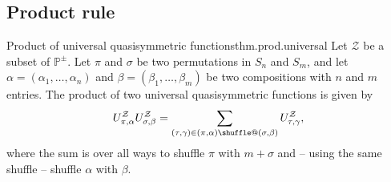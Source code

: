 \documentclass[numbers=enddot,12pt,final,onecolumn,notitlepage]{scrartcl}%
\makeatletter
\newcommand{\al}{\alpha}
\newcommand{\be}{\beta}
\newcommand{\PP}{\mathbb{P}} %
\providecommand*{\shuffle}{%
  \mathbin{\mathpalette\shuffle@{}}%
}
\newcommand*{\shuffle@}[2]{%
  \sbox0{$#1\vcenter{}$}%
  \kern .15\ht0 %
  \rlap{\vrule height .25\ht0 depth 0pt width 2.5\ht0}%
  \raise.1\ht0\hbox to 2.5\ht0{%
    \vrule height 1.75\ht0 depth -.1\ht0 width .17\ht0 %
    \hfill
    \vrule height 1.75\ht0 depth -.1\ht0 width .17\ht0 %
    \hfill
    \vrule height 1.75\ht0 depth -.1\ht0 width .17\ht0 %
  }%
  \kern .15\ht0 %
}
\newcommand{\0}{\phantom{c}}
\let\sumnonlimits\sum
\renewcommand{\sum}{\sumnonlimits\limits}
\makeatother
\begin{document}
\subsection{Product rule}
\begin{theorem}{Product of universal quasisymmetric functions}{thm.prod.universal}
Let $\mathcal{Z}$ be a subset of $\PP^{\pm}$.
Let $\pi$ and $\sigma$ be two permutations in $S_n$ and $S_m$, and let $\alpha = (\al_1,\dots,\al_n)$ and $\beta = (\be_1,\dots,\be_m)$ be two compositions with $n$ and $m$ entries.
The product of two universal quasisymmetric functions is given by
\begin{equation}
\label{eq : UU}
U^\mathcal{Z}_{\pi,\alpha}U^\mathcal{Z}_{\sigma,\beta}=\sum_{(\tau,\gamma)\in(\pi,\alpha)\shuffle(\sigma,\beta)}U^\mathcal{Z}_{\tau,\gamma} ,
\end{equation}
where the sum is over all ways to shuffle $\pi$ with $m + \sigma$ and -- using the same shuffle -- shuffle $\alpha$ with $\beta$.
\end{theorem}

\end{document}
